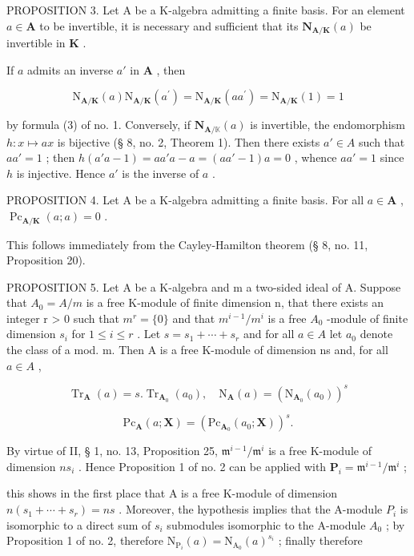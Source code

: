 PROPOSITION 3. Let A be a K-algebra admitting a finite basis. For an element \(a \in \mathbf{A}\) to be invertible, it is necessary and sufficient that its \(\mathbf{N}_{\mathbf{A} / \mathbf{K}}(a)\) be invertible in \(\mathbf{K}\) .

If \(a\) admits an inverse \(a'\) in \(\mathbf{A}\) , then

\[
\mathrm{N} _ {\mathbf {A} / \mathbf {K}} (a) \mathrm{N} _ {\mathbf {A} / \mathbf {K}} (a ^ {\prime}) = \mathrm{N} _ {\mathbf {A} / \mathbf {K}} (a a ^ {\prime}) = \mathrm{N} _ {\mathbf {A} / \mathbf {K}} (1) = 1
\]

by formula (3) of no. 1. Conversely, if \(\mathbf{N}_{\mathbf{A} / \mathbb{K}}(a)\) is invertible, the endomorphism \(h: x \mapsto ax\) is bijective (§ 8, no. 2, Theorem 1). Then there exists \(a' \in A\) such that \(aa' = 1\) ; then \(h(a'a - 1) = aa'a - a = (aa' - 1)a = 0\) , whence \(aa' = 1\) since \(h\) is injective. Hence \(a'\) is the inverse of \(a\) .

PROPOSITION 4. Let A be a K-algebra admitting a finite basis. For all \(a \in \mathbf{A}\) , \(\operatorname{Pc}_{\mathbf{A} / \mathbf{K}}(a; a) = 0\) .

This follows immediately from the Cayley-Hamilton theorem (§ 8, no. 11, Proposition 20).

PROPOSITION 5. Let A be a K-algebra and m a two-sided ideal of A. Suppose that \(A_{0} = A/m\) is a free K-module of finite dimension n, that there exists an integer r \textgreater{} 0 such that \(m^{r} = \{0\}\) and that \(m^{i-1}/m^{i}\) is a free \(A_{0}\) -module of finite dimension \(s_{i}\) for \(1 \leqslant i \leqslant r\) . Let \(s = s_{1} + \cdots + s_{r}\) and for all \(a \in A\) let \(a_{0}\) denote the class of a mod. m. Then A is a free K-module of dimension ns and, for all \(a \in A\) ,

\[
\operatorname{Tr} _ {\mathbf {A}} (a) = s. \operatorname{Tr} _ {\mathbf {A} _ {0}} (a _ {0}), \quad \mathrm{N} _ {\mathbf {A}} (a) = (\mathrm{N} _ {\mathbf {A} _ {0}} (a _ {0})) ^ {s}\tag{23}
\]

\[
\mathrm{Pc} _ {\mathbf {A}} (a; \mathbf {X}) = (\mathrm{Pc} _ {\mathbf {A} _ {0}} (a _ {0}; \mathbf {X})) ^ {s}.
\]

By virtue of II, § 1, no. 13, Proposition 25, \(\mathfrak{m}^{i - 1} / \mathfrak{m}^{i}\) is a free K-module of dimension \(ns_i\) . Hence Proposition 1 of no. 2 can be applied with \(\mathbf{P}_i = \mathfrak{m}^{i - 1} / \mathfrak{m}^{i}\) ;

this shows in the first place that A is a free K-module of dimension \(n(s_{1} + \cdots + s_{r}) = ns\) . Moreover, the hypothesis implies that the A-module \(P_{i}\) is isomorphic to a direct sum of \(s_{i}\) submodules isomorphic to the A-module \(A_{0}\) ; by Proposition 1 of no. 2, therefore \(\mathrm{N}_{\mathrm{P}_{i}}(a) = \mathrm{N}_{\mathrm{A}_{0}}(a)^{s_{i}}\) ; finally therefore

